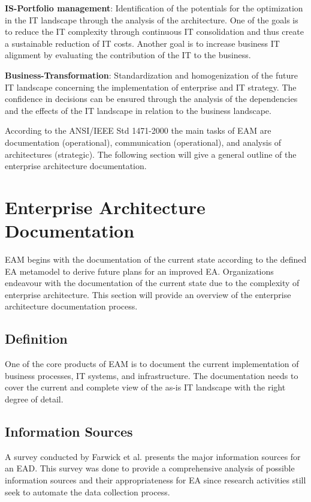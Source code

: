 \textbf{IS-Portfolio management}: Identification of the potentials for the optimization in the IT landscape through the analysis of the architecture. One of the goals is to reduce the IT complexity through continuous IT consolidation and thus create a sustainable reduction of IT costs. Another goal is to increase business IT alignment by evaluating the contribution of the IT to the business.

\textbf{Business-Transformation}: Standardization and homogenization of the future IT landscape
concerning the implementation of enterprise and IT strategy. The confidence in decisions can be ensured through the analysis of the dependencies and the effects of the IT landscape in relation to the business landscape.

According to the ANSI/IEEE Std 1471-2000 the main tasks of EAM are documentation (operational), communication (operational), and analysis of architectures (strategic). The following section will give a general outline of the enterprise architecture documentation.


\section{Enterprise Architecture Documentation} \label{section:enterprisearchitecturedocumentation}

EAM begins with the documentation of the current state according to the defined EA metamodel to  derive future plans for an improved EA. Organizations endeavour with the documentation of the current state due to the complexity of enterprise architecture. This section will provide an overview of the enterprise architecture documentation process.

\subsection{Definition}

One of the core products of EAM is to document the current implementation of business processes, IT systems, and infrastructure. \cite{Kaisler2005} The documentation needs to cover the current and complete view of the as-is IT landscape with the right degree of detail. \cite{Kaisler2005}\cite{VanDerRaadt2008}

\subsection{Information Sources}
A survey conducted by Farwick et al. \cite{Farwick2013} presents the major information sources for an EAD. This survey was done to provide a comprehensive analysis of possible information sources and their appropriateness for EA since research activities still seek to automate the data collection process.

